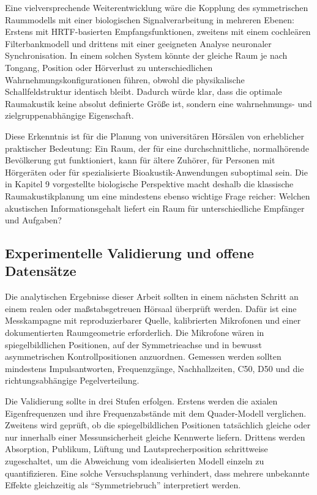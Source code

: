 ﻿\documentclass[12pt, a4paper]{article}
\theoremstyle{definition}
\theoremstyle{remark}
\begin{document}
Eine vielversprechende Weiterentwicklung wäre die Kopplung des symmetrischen
Raummodells mit einer biologischen Signalverarbeitung in mehreren Ebenen: Erstens mit
HRTF-basierten Empfangsfunktionen, zweitens mit einem cochleären Filterbankmodell
und drittens mit einer geeigneten Analyse neuronaler Synchronisation. In einem solchen
System könnte der gleiche Raum je nach Tongang, Position oder Hörverlust zu
unterschiedlichen Wahrnehmungskonfigurationen führen, obwohl die physikalische
Schallfeldstruktur identisch bleibt. Dadurch würde klar, dass die optimale Raumakustik
keine absolut definierte Größe ist, sondern eine wahrnehmungs- und zielgruppenabhängige
Eigenschaft.

Diese Erkenntnis ist für die Planung von universitären Hörsälen von erheblicher
praktischer Bedeutung: Ein Raum, der für eine durchschnittliche, normalhörende
Bevölkerung gut funktioniert, kann für ältere Zuhörer, für Personen mit Hörgeräten oder
für spezialisierte Bioakustik-Anwendungen suboptimal sein. Die in Kapitel 9 vorgestellte
biologische Perspektive macht deshalb die klassische Raumakustikplanung um eine
mindestens ebenso wichtige Frage reicher: Welchen akustischen Informationsgehalt
liefert ein Raum für unterschiedliche Empfänger und Aufgaben?

\subsection{Experimentelle Validierung und offene Datensätze}

Die analytischen Ergebnisse dieser Arbeit sollten in einem nächsten Schritt an einem
realen oder maßstabsgetreuen Hörsaal überprüft werden. Dafür ist eine Messkampagne
mit reproduzierbarer Quelle, kalibrierten Mikrofonen und einer dokumentierten
Raumgeometrie erforderlich. Die Mikrofone wären in spiegelbildlichen Positionen,
auf der Symmetrieachse und in bewusst asymmetrischen Kontrollpositionen anzuordnen.
Gemessen werden sollten mindestens Impulsantworten, Frequenzgänge, Nachhallzeiten,
C50, D50 und die richtungsabhängige Pegelverteilung.

Die Validierung sollte in drei Stufen erfolgen. Erstens werden die axialen
Eigenfrequenzen und ihre Frequenzabstände mit dem Quader-Modell verglichen. Zweitens
wird geprüft, ob die spiegelbildlichen Positionen tatsächlich gleiche oder nur
innerhalb einer Messunsicherheit gleiche Kennwerte liefern. Drittens werden
Absorption, Publikum, Lüftung und Lautsprecherposition schrittweise zugeschaltet,
um die Abweichung vom idealisierten Modell einzeln zu quantifizieren. Eine solche
Versuchsplanung verhindert, dass mehrere unbekannte Effekte gleichzeitig als
``Symmetriebruch'' interpretiert werden.
\end{document}
